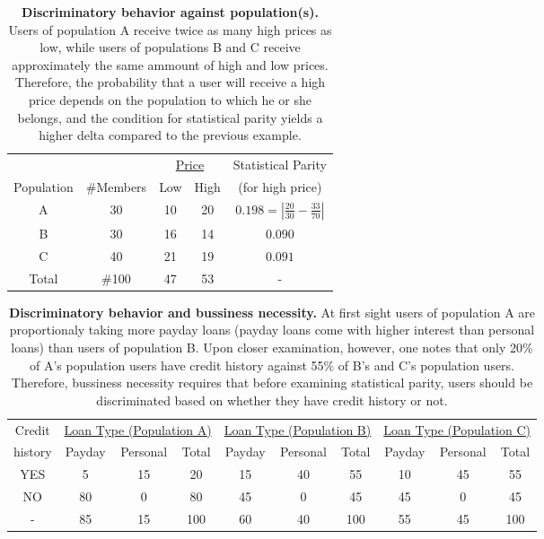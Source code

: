\begin{table}[!h]
{
  \renewcommand{\arraystretch}{1.5}
  \begin{tabular}{ c | c | c  c | c }
    & & \multicolumn{2}{|c|}{\underline{Price}} &  Statistical Parity\\
    Population & \#Members & Low & High & (for high price) \\
    \hline
    A & 30 &  10 & 20 & $0.198 = | \frac{20}{30} - \frac{33}{70}|$ \\
    B & 30 &  16 & 14 & $0.090$ \\
    C & 40 &  21 & 19 & $0.091$ \\
    \hline
    Total & \#100 & 47 & 53 & - \\
  \end{tabular}
  \caption{{\bf Discriminatory behavior against population(s).} Users of population A receive twice
  as many high prices as low, while users of populations B and C receive approximately the same
  ammount of high and low prices. Therefore, the probability that a user will receive a high price
  depends on the population to which he or she belongs, and the condition for statistical parity
  yields a higher delta compared to the previous example. }
  \label{tab:S}
} \end{table}

\begin{table*}[t]
{\center
  \renewcommand{\arraystretch}{1.5}
  \begin{tabular}{ c | c c c | c c c | c c c}
    Credit
    & \multicolumn{3}{|c|}{\underline{Loan Type (Population A)}}
    & \multicolumn{3}{|c}{\underline{Loan Type (Population B) }}
    & \multicolumn{3}{|c}{\underline{Loan Type (Population C) }} \\
    history & Payday & Personal & Total & Payday & Personal & Total & Payday & Personal & Total \\
    \hline
    YES & 5  & 15 & 20 & 15 & 40 & 55 & 10 & 45 & 55 \\
    NO  & 80 & 0  & 80 & 45 & 0 & 45 & 45 & 0 & 45\\
    \hline
    - & 85 & 15 & 100 & 60 & 40 & 100 & 55 & 45 & 100\\
  \end{tabular}
  \caption{{\bf Discriminatory behavior and bussiness necessity.} At first sight users of
  population A are proportionaly taking more payday loans (payday loans come with higher interest
  than personal loans) than users of population B. Upon closer examination, however, one notes that
  only 20\% of A's population users have credit history against 55\% of B's and C's population users.
  Therefore, bussiness necessity requires that before examining statistical parity, users should be
  discriminated based on whether they have credit history or not.}
  \label{tab:S}
} \end{table*}


